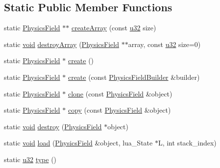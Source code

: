 \subsection*{Static Public Member Functions}
\begin{DoxyCompactItemize}
\item 
static \mbox{\hyperlink{classnjli_1_1_physics_field}{Physics\+Field}} $\ast$$\ast$ \mbox{\hyperlink{classnjli_1_1_physics_field_a4646a470388fbb4fd5f405d911e31bb0}{create\+Array}} (const \mbox{\hyperlink{_util_8h_a10e94b422ef0c20dcdec20d31a1f5049}{u32}} size)
\item 
static \mbox{\hyperlink{_thread_8h_af1e856da2e658414cb2456cb6f7ebc66}{void}} \mbox{\hyperlink{classnjli_1_1_physics_field_a8190a354cc130035426f76c9d815e643}{destroy\+Array}} (\mbox{\hyperlink{classnjli_1_1_physics_field}{Physics\+Field}} $\ast$$\ast$array, const \mbox{\hyperlink{_util_8h_a10e94b422ef0c20dcdec20d31a1f5049}{u32}} size=0)
\item 
static \mbox{\hyperlink{classnjli_1_1_physics_field}{Physics\+Field}} $\ast$ \mbox{\hyperlink{classnjli_1_1_physics_field_a3e58b5592e7ce80d50b9a0a74ee55782}{create}} ()
\item 
static \mbox{\hyperlink{classnjli_1_1_physics_field}{Physics\+Field}} $\ast$ \mbox{\hyperlink{classnjli_1_1_physics_field_a888c01a315f5470a00e7f77d9b9a7f64}{create}} (const \mbox{\hyperlink{classnjli_1_1_physics_field_builder}{Physics\+Field\+Builder}} \&builder)
\item 
static \mbox{\hyperlink{classnjli_1_1_physics_field}{Physics\+Field}} $\ast$ \mbox{\hyperlink{classnjli_1_1_physics_field_ab77b1adf0af32187fef707b33332ed80}{clone}} (const \mbox{\hyperlink{classnjli_1_1_physics_field}{Physics\+Field}} \&object)
\item 
static \mbox{\hyperlink{classnjli_1_1_physics_field}{Physics\+Field}} $\ast$ \mbox{\hyperlink{classnjli_1_1_physics_field_a5fe0a67fa8b3648d408c4ba38c43aba8}{copy}} (const \mbox{\hyperlink{classnjli_1_1_physics_field}{Physics\+Field}} \&object)
\item 
static \mbox{\hyperlink{_thread_8h_af1e856da2e658414cb2456cb6f7ebc66}{void}} \mbox{\hyperlink{classnjli_1_1_physics_field_ae7e7079ad19483fb8add9e33af27e913}{destroy}} (\mbox{\hyperlink{classnjli_1_1_physics_field}{Physics\+Field}} $\ast$object)
\item 
static \mbox{\hyperlink{_thread_8h_af1e856da2e658414cb2456cb6f7ebc66}{void}} \mbox{\hyperlink{classnjli_1_1_physics_field_ab50dd31d1199fec053ed695a7c6edec0}{load}} (\mbox{\hyperlink{classnjli_1_1_physics_field}{Physics\+Field}} \&object, lua\+\_\+\+State $\ast$L, int stack\+\_\+index)
\item 
static \mbox{\hyperlink{_util_8h_a10e94b422ef0c20dcdec20d31a1f5049}{u32}} \mbox{\hyperlink{classnjli_1_1_physics_field_af3b1cbe263122bd34e418930a9a2f9e6}{type}} ()
\end{DoxyCompactItemize}
